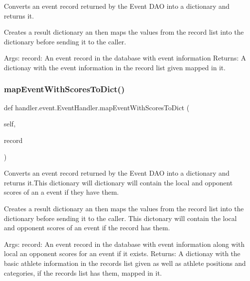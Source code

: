 \begin{DoxyVerb}Converts an event record returned by the Event DAO into a dictionary 
and returns it.

Creates a result dictionary an then maps the values from the record 
list into the dictionary before sending it to the caller.

Args:
    record: An event record in the database with event information
Returns:
    A dictionay with the event information in the record list given
    mapped in it.
\end{DoxyVerb}
 \mbox{\label{classhandler_1_1event_1_1_event_handler_a75d66da35627aebf7cc6cff5cb93f6e0}} 
\subsubsection{\texorpdfstring{map\+Event\+With\+Scores\+To\+Dict()}{mapEventWithScoresToDict()}}
{\footnotesize\ttfamily def handler.\+event.\+Event\+Handler.\+map\+Event\+With\+Scores\+To\+Dict (\begin{DoxyParamCaption}\item[{}]{self,  }\item[{}]{record }\end{DoxyParamCaption})}

\begin{DoxyVerb}Converts  an event record returned by the Event DAO into a dictionary 
and returns it.This dictionary will dictionary will contain the local
and opponent scores of an a event if they have them.

Creates a result dictionary an then maps the values from the record 
list into the dictionary before sending it to the caller. This dictonary 
will contain the local and opponent scores of an event if the record has
them.
     
Args:
    record: An event record in the database with event information along with
    local an opponent scores for an event if it exists.
Returns:
    A dictionay with the basic athlete information in the records list given as well
    as athlete positions and categories, if the records list has them, mapped in it.
\end{DoxyVerb}
 \mbox{\label{classhandler_1_1event_1_1_event_handler_a511281731fc33fae52d80e432680692d}} 
